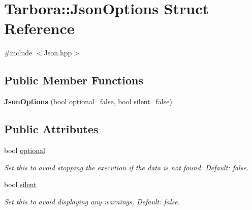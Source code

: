 \hypertarget{structTarbora_1_1JsonOptions}{}\section{Tarbora\+:\+:Json\+Options Struct Reference}
\label{structTarbora_1_1JsonOptions}


{\ttfamily \#include $<$Json.\+hpp$>$}

\subsection*{Public Member Functions}
\begin{DoxyCompactItemize}
\item 
\mbox{\label{structTarbora_1_1JsonOptions_af4873c194efbe5e01515569836e73171}} 
{\bfseries Json\+Options} (bool \hyperlink{structTarbora_1_1JsonOptions_a46cef6f4c644afd0169604edabf6a0a1}{optional}=false, bool \hyperlink{structTarbora_1_1JsonOptions_af8949cb54a5a7e8f08c104f9e9b1cd6f}{silent}=false)
\end{DoxyCompactItemize}
\subsection*{Public Attributes}
\begin{DoxyCompactItemize}
\item 
\mbox{\label{structTarbora_1_1JsonOptions_a46cef6f4c644afd0169604edabf6a0a1}} 
bool \hyperlink{structTarbora_1_1JsonOptions_a46cef6f4c644afd0169604edabf6a0a1}{optional}
\begin{DoxyCompactList}\small\item\em Set this to avoid stopping the execution if the data is not found. Default\+: false. \end{DoxyCompactList}\item 
\mbox{\label{structTarbora_1_1JsonOptions_af8949cb54a5a7e8f08c104f9e9b1cd6f}} 
bool \hyperlink{structTarbora_1_1JsonOptions_af8949cb54a5a7e8f08c104f9e9b1cd6f}{silent}
\begin{DoxyCompactList}\small\item\em Set this to avoid displaying any warnings. Default\+: false. \end{DoxyCompactList}\end{DoxyCompactItemize}


